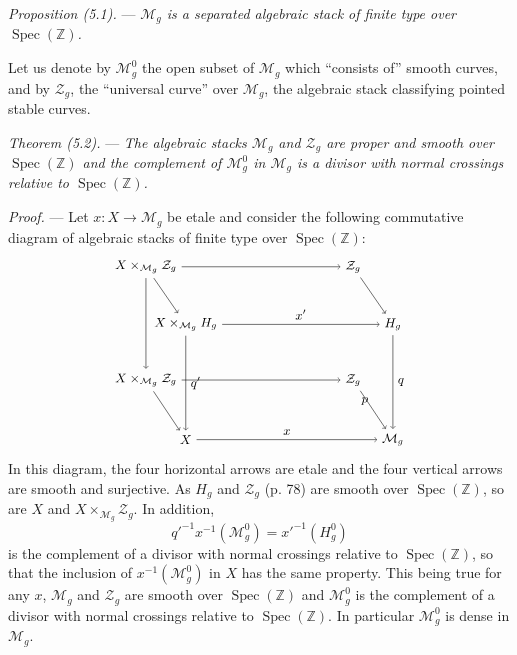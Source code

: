 \documentclass[10pt]{article}
\newcommand{\Spec}{\operatorname{Spec}}
\begin{document}
\medskip
\noindent\emph{Proposition (5.1).} --- \emph{$\mathcal M_g$ is a separated algebraic stack of finite type over $\Spec(\mathbb Z)$.}

Let us denote by $\mathcal M_g^0$ the open subset of $\mathcal M_g$ which ``consists of'' smooth curves, and by $\mathcal Z_g$, the ``universal curve'' over $\mathcal M_g$, the algebraic stack classifying pointed stable curves.

\medskip
\noindent\emph{Theorem (5.2).} --- \emph{The algebraic stacks $\mathcal M_g$ and $\mathcal Z_g$ are proper and smooth over $\Spec(\mathbb Z)$ and the complement of $\mathcal M_g^0$ in $\mathcal M_g$ is a divisor with normal crossings relative to $\Spec(\mathbb Z)$.}

\noindent\emph{Proof.} --- Let $x:X\to\mathcal M_g$ be etale and consider the following commutative diagram of algebraic stacks of finite type over $\Spec(\mathbb Z)$:
\[
\begin{tikzpicture}[baseline=(current bounding box.center), x=1cm, y=1cm, every node/.style={font=\small}]
\node (A) at (0,3.6) {$X\times_{\mathcal M_g}\mathcal Z_g$};
\node (B) at (5.2,3.6) {$\mathcal Z_g$};
\node (C) at (1.0,2.15) {$X\times_{\mathcal M_g}H_g$};
\node (D) at (6.2,2.15) {$H_g$};
\node (E) at (0,0.75) {$X\times_{\mathcal M_g}\mathcal Z_g$};
\node (F) at (5.2,0.75) {$\mathcal Z_g$};
\node (G) at (1.0,-0.75) {$X$};
\node (H) at (6.2,-0.75) {$\mathcal M_g$};
\draw[->] (A) -- (B);
\draw[->] (C) -- node[above] {$x'$} (D);
\draw[->] (E) -- (F);
\draw[->] (G) -- node[above] {$x$} (H);
\draw[->] (A) -- (E);
\draw[->] (B) -- (D);
\draw[->] (D) -- node[right] {$q$} (H);
\draw[->] (F) -- node[above left] {$p$} (H);
\draw[->] (A) -- (C);
\draw[->] (C) -- node[right] {$q'$} (G);
\draw[->] (E) -- (G);
\end{tikzpicture}
\]
In this diagram, the four horizontal arrows are etale and the four vertical arrows are smooth and surjective. As $H_g$ and $\mathcal Z_g$ (p. 78) are smooth over $\Spec(\mathbb Z)$, so are $X$ and $X\times_{\mathcal M_g}\mathcal Z_g$. In addition,
\[
q'^{-1}x^{-1}(\mathcal M_g^0)=x'^{-1}(H_g^0)
\]
is the complement of a divisor with normal crossings relative to $\Spec(\mathbb Z)$, so that the inclusion of $x^{-1}(\mathcal M_g^0)$ in $X$ has the same property. This being true for any $x$, $\mathcal M_g$ and $\mathcal Z_g$ are smooth over $\Spec(\mathbb Z)$ and $\mathcal M_g^0$ is the complement of a divisor with normal crossings relative to $\Spec(\mathbb Z)$. In particular $\mathcal M_g^0$ is dense in $\mathcal M_g$.
\end{document}
